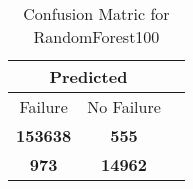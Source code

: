 \begin{table}[] 
\caption{Confusion Matric for RandomForest100} 
\label{Table: Prediction Accuracy-NoneRandomForest100100.0EKF-ignoreReflection-Reflection} 
\centering 
\begin{tabular} 
 {@{}ccc@{}} 
\toprule 
\multicolumn{2}{c}{\textbf{Predicted}}
 \\ \midrule 
\multicolumn{1}{|c|}{Failure} & 
\multicolumn{1}{c|}{No Failure}
 \\ \midrule 
\multicolumn{1}{|c|}{\color{green}\textbf{153638}} & 
\multicolumn{1}{c|}{\color{red}\textbf{555}}
 \\ \midrule 
\multicolumn{1}{|c|}{\color{red}\textbf{973}} & 
\multicolumn{1}{c|}{\color{green}\textbf{14962}}
 \\ \bottomrule 
\end{tabular} 
\end{table} 
